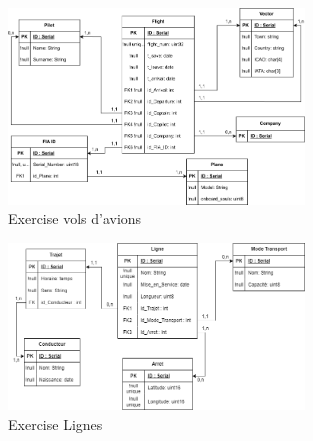 \documentclass[11pt, openright]{book}
\begin{document}

\newpage

\begin{figure}[!ht]
    \centering
    \includegraphics[width=0.7\textwidth]{./object/g1.png}
    \caption{Exercise vols d'avions}
\end{figure}


\begin{figure}[!ht]
    \centering
    \includegraphics[width=0.7\textwidth]{./object/g2.png}
    \caption{Exercise Lignes}
\end{figure}
\end{document}

